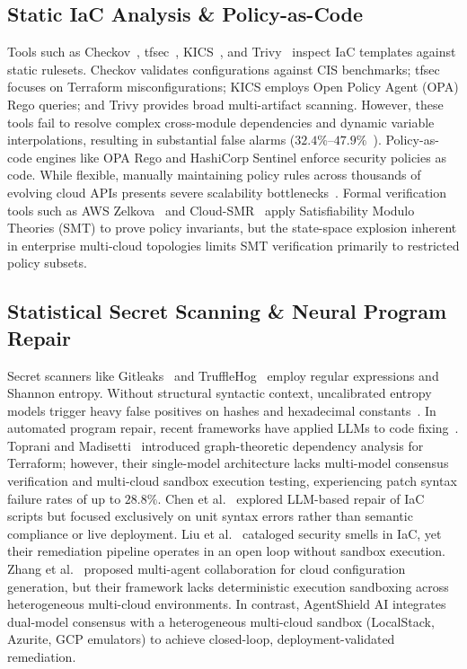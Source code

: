 \documentclass[runningheads]{llncs}
\begin{document}
\subsection{Static IaC Analysis \& Policy-as-Code}
Tools such as Checkov~\cite{checkov2024}, tfsec~\cite{tfsec2023}, KICS~\cite{kics2022}, and Trivy~\cite{trivy2024} inspect IaC templates against static rulesets. Checkov validates configurations against CIS benchmarks; tfsec focuses on Terraform misconfigurations; KICS employs Open Policy Agent (OPA) Rego queries; and Trivy provides broad multi-artifact scanning. However, these tools fail to resolve complex cross-module dependencies and dynamic variable interpolations, resulting in substantial false alarms ($32.4\%$--$47.9\%$~\cite{kumara2022evaluating}). Policy-as-code engines like OPA Rego and HashiCorp Sentinel enforce security policies as code. While flexible, manually maintaining policy rules across thousands of evolving cloud APIs presents severe scalability bottlenecks~\cite{kumara2022evaluating}. Formal verification tools such as AWS Zelkova~\cite{backes2018smt} and Cloud-SMR~\cite{song2023cloud} apply Satisfiability Modulo Theories (SMT) to prove policy invariants, but the state-space explosion inherent in enterprise multi-cloud topologies limits SMT verification primarily to restricted policy subsets.

\subsection{Statistical Secret Scanning \& Neural Program Repair}
Secret scanners like Gitleaks~\cite{gitleaks2024} and TruffleHog~\cite{trufflehog2024} employ regular expressions and Shannon entropy. Without structural syntactic context, uncalibrated entropy models trigger heavy false positives on hashes and hexadecimal constants~\cite{shannon1948mathematical}. In automated program repair, recent frameworks have applied LLMs to code fixing~\cite{pearce2023examining,jin2023inferfix,joshi2024repairllm}. Toprani and Madisetti~\cite{toprani2025automated} introduced graph-theoretic dependency analysis for Terraform; however, their single-model architecture lacks multi-model consensus verification and multi-cloud sandbox execution testing, experiencing patch syntax failure rates of up to $28.8\%$. Chen et al.~\cite{chen2024automated} explored LLM-based repair of IaC scripts but focused exclusively on unit syntax errors rather than semantic compliance or live deployment. Liu et al.~\cite{liu2024security} cataloged security smells in IaC, yet their remediation pipeline operates in an open loop without sandbox execution. Zhang et al.~\cite{zhang2025multiagent} proposed multi-agent collaboration for cloud configuration generation, but their framework lacks deterministic execution sandboxing across heterogeneous multi-cloud environments. In contrast, AgentShield AI integrates dual-model consensus with a heterogeneous multi-cloud sandbox (LocalStack, Azurite, GCP emulators) to achieve closed-loop, deployment-validated remediation.
\end{document}
